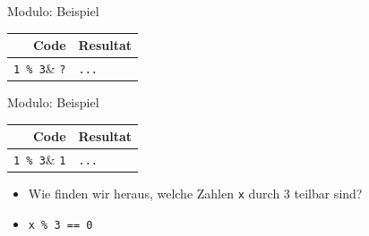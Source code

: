\begin{frame}[fragile]{Modulo: Beispiel}
\begin{table}
	\begin{tabular}{r|l}
	\textbf{Code} & \textbf{Resultat} \\\midrule\midrule
	\lstinline|1 % 3|& \lstinline|?|\\\midrule
	\lstinline|2 % 3|& \lstinline|?|\\\midrule
	\lstinline|3 % 3|& \lstinline|?|\\\midrule
	\lstinline|4 % 3|& \lstinline|?|\\\midrule
	\lstinline|5 % 3|& \lstinline|?|\\\midrule
	\lstinline|6 % 3|& \lstinline|?|\\\midrule
	\lstinline|...|& \lstinline|...|
	\end{tabular}
\end{table}
\end{frame}
\begin{frame}[fragile]{Modulo: Beispiel}
\begin{table}
	\begin{tabular}{r|l}
	\textbf{Code} & \textbf{Resultat} \\\midrule\midrule
	\lstinline|1 % 3|& \lstinline|1|\\\midrule
	\lstinline|2 % 3|& \lstinline|2|\\\midrule
	\lstinline|3 % 3|& \lstinline|0|\\\midrule
	\lstinline|4 % 3|& \lstinline|1|\\\midrule
	\lstinline|5 % 3|& \lstinline|2|\\\midrule
	\lstinline|6 % 3|& \lstinline|0|\\\midrule
	\lstinline|...|& \lstinline|...|
	\end{tabular}
\end{table}

\begin{itemize}[<+->]
\item Wie finden wir heraus, welche Zahlen \lstinline|x| durch 3 teilbar sind?
\item \lstinline|x % 3 == 0|
\end{itemize}
\end{frame}

